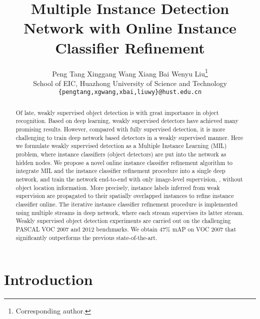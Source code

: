 \documentclass[10pt,twocolumn,letterpaper]{article}
\begin{document}
\title{Multiple Instance Detection Network with Online Instance Classifier Refinement}

\author{Peng Tang
\quad
Xinggang Wang
\quad
Xiang Bai
\quad
Wenyu Liu\thanks{Corresponding author.}\\
School of EIC, Huazhong University of Science and Technology\\
{\tt\small \{pengtang,xgwang,xbai,liuwy\}@hust.edu.cn}
}

\maketitle

\begin{abstract}
   Of late, weakly supervised object detection is with great importance in object recognition.
   Based on deep learning, weakly supervised detectors have achieved many promising results.
   However, compared with fully supervised detection, it is more challenging to train deep network based detectors in a weakly supervised manner.
   Here we formulate weakly supervised detection as a Multiple Instance Learning (MIL) problem, where instance classifiers (object detectors) are put into the network as hidden nodes.
   We propose a novel online instance classifier refinement algorithm to integrate MIL and the instance classifier refinement procedure into a single deep network, and train the network end-to-end with only image-level supervision, \ie, without object location information.
   More precisely, instance labels inferred from weak supervision are propagated to their spatially overlapped instances to refine instance classifier online.
   The iterative instance classifier refinement procedure is implemented using multiple streams in deep network, where each stream supervises its latter stream.
   Weakly supervised object detection experiments are carried out on the challenging PASCAL VOC 2007 and 2012 benchmarks.
   We obtain $47\%$ mAP on VOC 2007 that significantly outperforms the previous state-of-the-art.
\end{abstract}


\section{Introduction}
\label{sec:intro}
\end{document}
